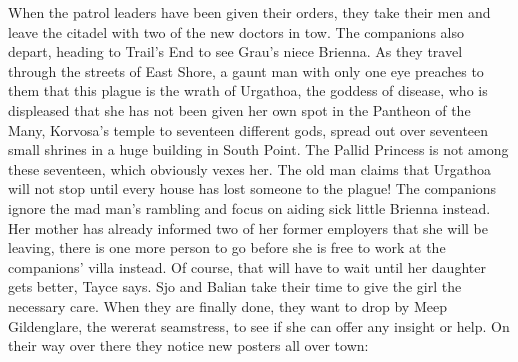 When the patrol leaders have been given their orders, they take their men and leave the citadel with two of the new doctors in tow. The companions also depart, heading to Trail's End to see Grau's niece Brienna. As they travel through the streets of East Shore, a gaunt man with only one eye preaches to them that this plague is the wrath of Urgathoa, the goddess of disease, who is displeased that she has not been given her own spot in the Pantheon of the Many, Korvosa's temple to seventeen different gods, spread out over seventeen small shrines in a huge building in South Point. The Pallid Princess is not among these seventeen, which obviously vexes her. The old man claims that Urgathoa will not stop until every house has lost someone to the plague! The companions ignore the mad man's rambling and focus on aiding sick little Brienna instead. Her mother has already informed two of her former employers that she will be leaving, there is one more person to go before she is free to work at the companions' villa instead. Of course, that will have to wait until her daughter gets better, Tayce says. Sjo and Balian take their time to give the girl the necessary care. When they are finally done, they want to drop by Meep Gildenglare, the wererat seamstress, to see if she can offer any insight or help. On their way over there they notice new posters all over town:\\

